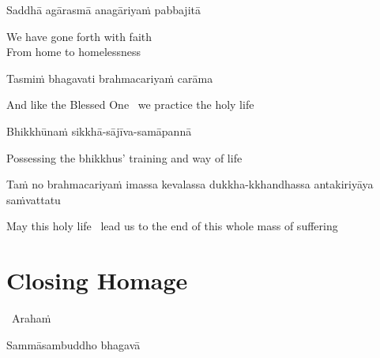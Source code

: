 Saddhā agārasmā anagāriyaṁ pabbajitā

\begin{english}
  We have gone forth with faith\\
  From home to homelessness
\end{english}

Tasmiṁ bhagavati brahmacariyaṁ carāma

\begin{english}
  And like the Blessed One \breathmark\ we practice the holy life
\end{english}

Bhikkhūnaṁ sikkhā-sājīva-samāpannā

\begin{english}
  Possessing the bhikkhus' training and way of life\makeatletter\hyperlink{endnote28-appendix}\makeatother
\end{english}

\begin{pali-hang}
  Taṁ no brahmacariyaṁ imassa kevalassa dukkha-kkhandhassa antakiriyāya saṁvattatu
\end{pali-hang}

\begin{english}
  May this holy life \breathmark\ lead us to the end of this whole mass of suffering
\end{english}

\suttaRef{[Thai]}


\section{Closing Homage}
\label{closing-homage}

\vspace{5pt}

\begin{leader}
  \anglebracketleft\ \hspace{-0.5mm}Arahaṁ \hspace{-0.5mm}\anglebracketright\
\end{leader}

\vspace{-0.5cm}

Sammāsambuddho bhagavā

